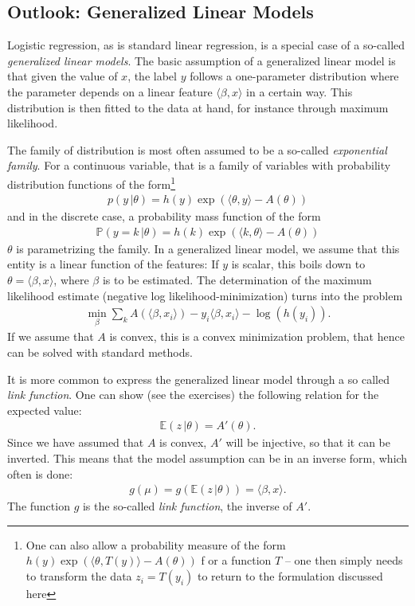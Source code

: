 \documentclass{article}
\newcommand{\erw}{\mathbb{E}} %
\newcommand{\sprod}[1]{\langle #1 \rangle}
\begin{document}
\subsection{Outlook: Generalized Linear Models}
Logistic regression, as is standard linear regression, is a special case of a so-called \emph{generalized linear models}. The basic assumption of a generalized linear model is that given the value of $x$, the label $y$ follows a one-parameter distribution where the parameter depends on a linear feature $\sprod{\beta,x}$ in  a certain way. This distribution is then fitted to the data at hand, for instance through maximum likelihood.

The family of distribution is most often assumed to be a so-called \emph{exponential family}. For a continuous variable, that is a family of variables with probability distribution functions of the form\footnote{One can also allow a probability measure of the form $h(y) \exp(\sprod{\theta,T(y)} - A(\theta)) $ f or a function $T$ -- one then simply needs to transform the data $z_i=T(y_i)$ to return to the formulation discussed here}
\begin{align*}
    p(y \, \vert \theta ) = h(y) \exp(\sprod{\theta,y} - A(\theta))
\end{align*}
and in the discrete case, a probability mass function of the form
\begin{align} 
    \mathbb{P}(y=k \, \vert \theta) =  h(k) \exp(\sprod{k,\theta} - A(\theta))
\end{align}
$\theta$ is parametrizing the family. In a generalized linear model, we assume that this entity is a linear function of the features: If $y$ is scalar, this boils down to $\theta=\sprod{\beta, x}$, where $\beta$ is to be estimated. The determination of the maximum likelihood estimate (negative log likelihood-minimization) turns into the problem
\begin{align} \label{eq:maxlikelihood}
    \min_\beta \sum_k A(\sprod{\beta,x_i})-y_i\sprod{\beta,x_i} - \log(h(y_i)).
\end{align}
If we assume that $A$ is convex, this is a convex minimization problem, that hence can be solved with standard methods.

It is more common to express the generalized linear model through a so called \emph{link function}. One can show (see the exercises) the following relation for the expected value:
\begin{align}
     \erw(z \, \vert \theta) = A'(\theta). \label{eq:mean}
\end{align}
Since we have assumed that $A$ is convex, $A'$ will be injective, so that it can be inverted. This means that the model assumption can be in an inverse form, which often is done:
\begin{align*}
    g(\mu) = g( \erw(z \, \vert \theta)) = \sprod{\beta,x}.
\end{align*}
The function $g$ is the so-called \emph{link function}, the inverse of $A'$.
\end{document}
